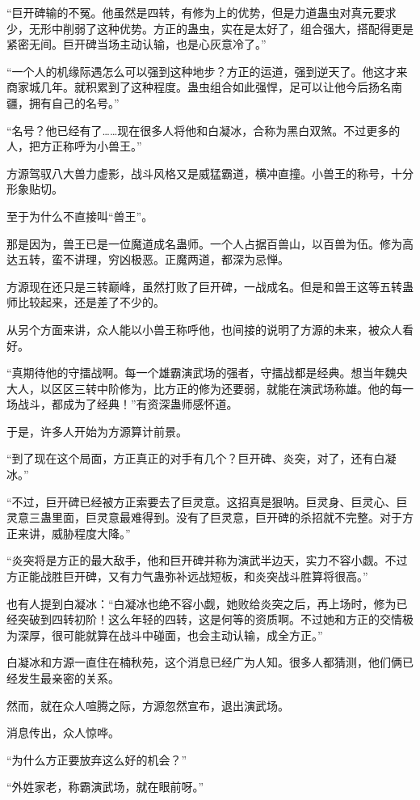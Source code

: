 \begin{this_body}
“巨开碑输的不冤。他虽然是四转，有修为上的优势，但是力道蛊虫对真元要求少，无形中削弱了这种优势。方正的蛊虫，实在是太好了，组合强大，搭配得更是紧密无间。巨开碑当场主动认输，也是心灰意冷了。”

“一个人的机缘际遇怎么可以强到这种地步？方正的运道，强到逆天了。他这才来商家城几年。就积累到了这种程度。蛊虫组合如此强悍，足可以让他今后扬名南疆，拥有自己的名号。”

“名号？他已经有了……现在很多人将他和白凝冰，合称为黑白双煞。不过更多的人，把方正称呼为小兽王。”

方源驾驭八大兽力虚影，战斗风格又是威猛霸道，横冲直撞。小兽王的称号，十分形象贴切。

至于为什么不直接叫“兽王”。

那是因为，兽王已是一位魔道成名蛊师。一个人占据百兽山，以百兽为伍。修为高达五转，蛮不讲理，穷凶极恶。正魔两道，都深为忌惮。

方源现在还只是三转巅峰，虽然打败了巨开碑，一战成名。但是和兽王这等五转蛊师比较起来，还是差了不少的。

从另个方面来讲，众人能以小兽王称呼他，也间接的说明了方源的未来，被众人看好。

“真期待他的守擂战啊。每一个雄霸演武场的强者，守擂战都是经典。想当年魏央大人，以区区三转中阶修为，比方正的修为还要弱，就能在演武场称雄。他的每一场战斗，都成为了经典！”有资深蛊师感怀道。

于是，许多人开始为方源算计前景。

“到了现在这个局面，方正真正的对手有几个？巨开碑、炎突，对了，还有白凝冰。”

“不过，巨开碑已经被方正索要去了巨灵意。这招真是狠呐。巨灵身、巨灵心、巨灵意三蛊里面，巨灵意最难得到。没有了巨灵意，巨开碑的杀招就不完整。对于方正来讲，威胁程度大降。”

“炎突将是方正的最大敌手，他和巨开碑并称为演武半边天，实力不容小觑。不过方正能战胜巨开碑，又有力气蛊弥补远战短板，和炎突战斗胜算将很高。”

也有人提到白凝冰：“白凝冰也绝不容小觑，她败给炎突之后，再上场时，修为已经突破到四转初阶！这么年轻的四转，这是何等的资质啊。不过她和方正的交情极为深厚，很可能就算在战斗中碰面，也会主动认输，成全方正。”

白凝冰和方源一直住在楠秋苑，这个消息已经广为人知。很多人都猜测，他们俩已经发生最亲密的关系。

然而，就在众人喧腾之际，方源忽然宣布，退出演武场。

消息传出，众人惊哗。

“为什么方正要放弃这么好的机会？”

“外姓家老，称霸演武场，就在眼前呀。”


\end{this_body}
